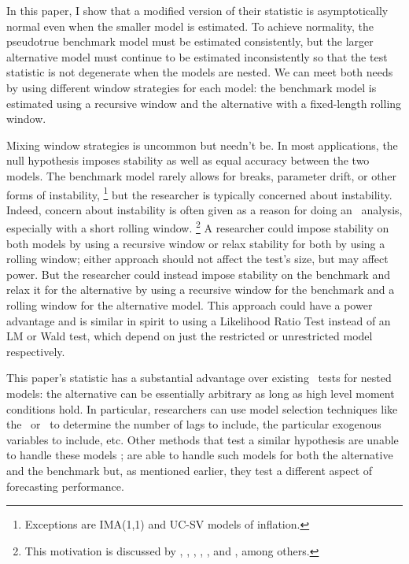 \documentclass[12pt,fleqn]{article}
\begin{document}
In this paper, I show that a modified version of their statistic is
asymptotically normal even when the smaller model is estimated.  To
achieve normality, the pseudotrue benchmark model must be estimated
consistently, but the larger alternative model must continue to be
estimated inconsistently so that the test statistic is not degenerate
when the models are nested. We can meet both needs by
using different window strategies for each model: the benchmark model
is estimated using a recursive window and the alternative with a
fixed-length rolling window.

Mixing window strategies is uncommon but needn't be. In most
applications, the null hypothesis imposes stability as well as equal
accuracy between the two models.  The benchmark model rarely allows
for breaks, parameter drift, or other forms of
instability,%
\footnote{Exceptions are 
  IMA(1,1) and UC-SV models of inflation.} %
but the
researcher is typically concerned about instability.  Indeed, concern
about instability is often given as a reason for doing an \oos\
analysis, especially with a short rolling window.%
\footnote{This
  motivation is discussed by \citet{StW:03}, \citet{PeT:05,PeT:07},
  \cite{GiW:06}, \citet{GoW:08}, \citet{ClM:09c}, and
  \cite{GiR:09,GiR:10}, among others.} %
A researcher could impose
stability on both models by using a recursive window or relax
stability for both by using a rolling window; either approach should
not affect the test's size, but may affect power.  But the researcher
could instead impose stability on the benchmark and relax it for the
alternative by using a recursive window for the benchmark and a
rolling window for the alternative model.  This approach could have a
power advantage and is similar in spirit to using a Likelihood Ratio
Test instead of an LM or Wald test, which depend on just the
restricted or unrestricted model respectively.

This paper's statistic has a substantial advantage over existing \oos\
tests for nested models: the alternative can be essentially arbitrary
as long as high level moment conditions hold.  In particular,
researchers can use model selection techniques like the \aic\ or \bic\
to determine the number of lags to include, the particular exogenous
variables to include, etc.  Other methods that test a similar
hypothesis are unable to handle these models \citep[except][which does
not allow the benchmark to be estimated]{ClW:06}; \citet{GiW:06} are
able to handle such models for both the alternative and the benchmark
but, as mentioned earlier, they test a different aspect of forecasting
performance.
\end{document}
